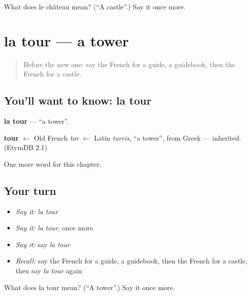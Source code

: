 \begin{tcolorbox}[breakable,colback=teal!4,colframe=teal!35!black,title={Before you move on}]
What does le château mean? (\textquotedblleft{}A castle\textquotedblright{}.) Say it once more.
\end{tcolorbox}
\section[la tour]{la tour — a tower}

\label{lesson:FR-C170-tour}



\begin{quote}
Before the new one: say the French for a guide, a guidebook, then the French for a castle.
\end{quote}

\subsection*{You'll want to know: la tour}
\textbf{la tour} — \textquotedblleft{}a tower\textquotedblright{}.

\begin{cousinweb}
\textbf{tour} $\leftarrow$ Old French \emph{tor} $\leftarrow$ Latin \emph{turris}, \textquotedblleft{}a tower\textquotedblright{}, from Greek — inherited. (EtymDB 2.1)
\end{cousinweb}

\begin{grammarlens}[title={What you've built}]
One more word for this chapter.
\end{grammarlens}

\subsection*{Your turn}
\begin{itemize}
\raggedright
  \item \emph{Say it:} \emph{la tour}
  \item \emph{Say it:} \emph{la tour}, once more
  \item \emph{Say it:} say \emph{la tour}
  \item \emph{Recall:} say the French for a guide, a guidebook, then the French for a castle, then say \emph{la tour} again
\end{itemize}

\begin{tcolorbox}[breakable,colback=teal!4,colframe=teal!35!black,title={Before you move on}]
What does la tour mean? (\textquotedblleft{}A tower\textquotedblright{}.) Say it once more.
\end{tcolorbox}
